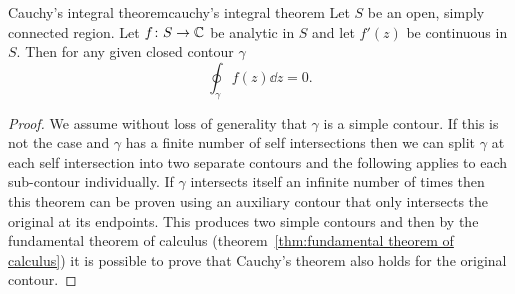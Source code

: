 \documentclass{article}
\begin{document}
    \begin{theorem}{Cauchy's integral theorem}{cauchy's integral theorem}
        Let \(S\) be an open, simply connected region.
        Let \(f\colon S\to\mathbb{C}\) be analytic in \(S\) and let \(f'(z)\) be continuous in \(S\).
        Then for any given closed contour \(\gamma\)
        \[\oint_{\gamma} f(z) \dd{z} = 0.\]
    \end{theorem}
    \begin{proof}
        We assume without loss of generality that \(\gamma\) is a simple contour.
        If this is not the case and \(\gamma\) has a finite number of self intersections then we can split \(\gamma\) at each self intersection into two separate contours and the following applies to each sub-contour individually.
        If \(\gamma\) intersects itself an infinite number of times then this theorem can be proven using an auxiliary contour that only intersects the original at its endpoints.
        This produces two simple contours and then by the fundamental theorem of calculus (theorem~\ref{thm:fundamental theorem of calculus}) it is possible to prove that Cauchy's theorem also holds for the original contour.
        

\end{proof}
\end{document}
